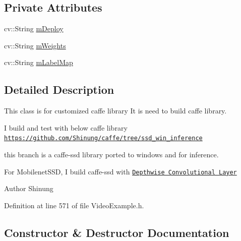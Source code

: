 \subsection*{Private Attributes}
\begin{DoxyCompactItemize}
\item 
cv\+::\+String \mbox{\hyperlink{class_custom_s_s_d_mobile_net_example_a5f0ab35a8bb7c9bbe48750551472d5bd}{m\+Deploy}}
\item 
cv\+::\+String \mbox{\hyperlink{class_custom_s_s_d_mobile_net_example_a3828507c8d2af5d9ba6f5a7de7fa3b42}{m\+Weights}}
\item 
cv\+::\+String \mbox{\hyperlink{class_custom_s_s_d_mobile_net_example_a15b05488bca85e442ba403ff02a24b5f}{m\+Label\+Map}}
\end{DoxyCompactItemize}


\subsection{Detailed Description}
This class is for customized caffe library It is need to build caffe library. 

I build and test with below caffe library \href{https://github.com/Shinung/caffe/tree/ssd_win_inference}{\tt https\+://github.\+com/\+Shinung/caffe/tree/ssd\+\_\+win\+\_\+inference}
\begin{DoxyItemize}
\item this branch is a caffe-\/ssd library ported to windows and for inference.
\item For Mobilenet\+S\+SD, I build caffe-\/ssd with \href{https://github.com/yonghenglh6/DepthwiseConvolution}{\tt Depthwise Convolutional Layer}
\end{DoxyItemize}

\begin{DoxyAuthor}{Author}
Shinung 
\end{DoxyAuthor}


Definition at line 571 of file Video\+Example.\+h.



\subsection{Constructor \& Destructor Documentation}
\mbox{\label{class_custom_s_s_d_mobile_net_example_a9e343f571db038199f28b6d1ed04eba5}} 
